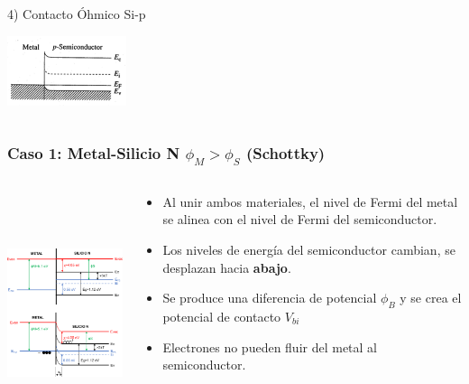 \documentclass[10pt,t,aspectratio=169]{beamer}
\begin{document}
\begin{frame}[t]
\begin{columns}
\begin{column}{0.33\textwidth}
            \flushleft\vspace{5mm}
            4) Contacto Óhmico Si-p

            \centering
            \includegraphics[width=3.5cm]{./figures/contactos4.png}
        \end{column}
    \end{columns}
\end{frame}


\begin{frame}[t]
    \frametitle{Caso 1:	Metal-Silicio N \hspace{1cm} $\phi_M>\phi_S$ \hspace{1cm} (Schottky)}

    \begin{columns}
    
        \begin{column}{0.5\textwidth}
        
            \centering
            \includegraphics[height=7cm]{./figures/contactos-caso1.pdf}
            
        \end{column}
        
        \begin{column}{0.5\textwidth}
        
            \begin{itemize}
                \item Al unir ambos materiales, el nivel de Fermi del metal se alinea con el nivel de Fermi del semiconductor.
                \item Los niveles de energía del semiconductor cambian, se desplazan hacia \textbf{abajo}.
                \item Se produce una diferencia de potencial $\phi_B$ y se crea el potencial de contacto $V_{bi}$
                \item Electrones no pueden fluir del metal al semiconductor.
            \end{itemize}


\end{column}
\end{columns}
\end{frame}
\end{document}
